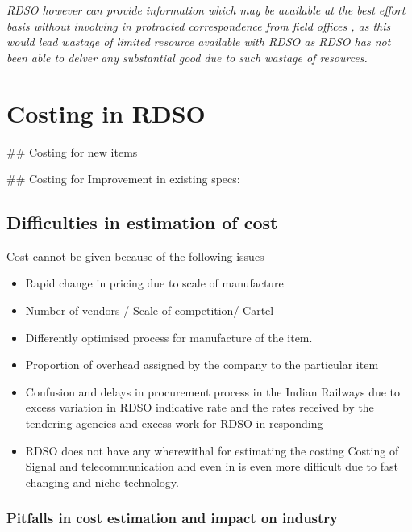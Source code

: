 \documentclass[
  10pt,
  twoside]{article}
\providecommand{\tightlist}{%
  \setlength{\itemsep}{0pt}\setlength{\parskip}{0pt}}
\begin{document}
\emph{RDSO however can provide information which may be available at the
best effort basis without involving in protracted correspondence from
field offices , as this would lead wastage of limited resource available
with RDSO as RDSO has not been able to delver any substantial good due
to such wastage of resources.}

\hypertarget{costing-in-rdso}{%
\section{Costing in RDSO}\label{costing-in-rdso}}

\#\# Costing for new items

\#\# Costing for Improvement in existing specs:

\hypertarget{difficulties-in-estimation-of-cost}{%
\subsection{Difficulties in estimation of
cost}\label{difficulties-in-estimation-of-cost}}

Cost cannot be given because of the following issues

\begin{itemize}
\tightlist
\item
  Rapid change in pricing due to scale of manufacture
\item
  Number of vendors / Scale of competition/ Cartel
\item
  Differently optimised process for manufacture of the item.
\item
  Proportion of overhead assigned by the company to the particular item
\item
  Confusion and delays in procurement process in the Indian Railways due
  to excess variation in RDSO indicative rate and the rates received by
  the tendering agencies and excess work for RDSO in responding
\item
  RDSO does not have any wherewithal for estimating the costing Costing
  of Signal and telecommunication and even in is even more difficult due
  to fast changing and niche technology.
\end{itemize}

\hypertarget{pitfalls-in-cost-estimation-and-impact-on-industry}{%
\subsubsection{Pitfalls in cost estimation and impact on
industry}\label{pitfalls-in-cost-estimation-and-impact-on-industry}}
\end{document}
